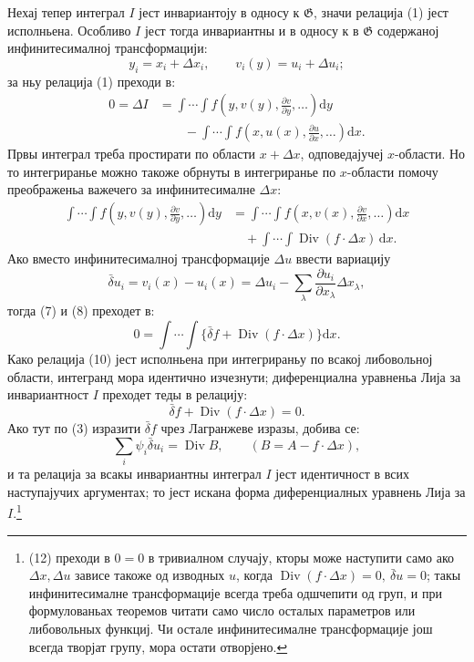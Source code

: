 ﻿\documentclass[11pt]{article}
\providecommand{\G}{\mathfrak G}
\providecommand{\D}{\Delta}
\providecommand{\p}{\partial}
\providecommand{\dd}{\mathrm d}
\DeclareMathOperator{\Div}{Div}
\providecommand{\bd}{\bar{\delta}}
\begin{document}
Нехај тепер интеграл \(I\) јест инвариантоју в односу к \(\G\), значи релација (1) јест исполньена. Особливо \(I\) јест тогда инвариантны и в односу к в \(\G\) содержаној инфинитесималној трансформацији:
\[
y_i=x_i+\D x_i,\qquad v_i(y)=u_i+\D u_i;
\]
за ньу релација (1) преходи в:
\begin{equation}
\begin{aligned}
0=\D I
&=\int\!\cdots\!\int f\!\left(y,v(y),\frac{\p v}{\p y},\ldots\right)\dd y\\
&\qquad-\int\!\cdots\!\int f\!\left(x,u(x),\frac{\p u}{\p x},\ldots\right)\dd x.
\end{aligned}
\tag{7}
\end{equation}
Првы интеграл треба простирати по области \(x+\D x\), одповедајучеј \(x\)-области. Но то интегриранье можно такоже обрнуты в интегриранье по \(x\)-области помочу преображеньа важечего за инфинитесималне \(\D x\):
\begin{equation}
\begin{aligned}
\int\!\cdots\!\int f\!\left(y,v(y),\frac{\p v}{\p y},\ldots\right)\dd y
&=\int\!\cdots\!\int f\!\left(x,v(x),\frac{\p v}{\p x},\ldots\right)\dd x\\
&\quad+\int\!\cdots\!\int \Div(f\cdot \D x)\,\dd x.
\end{aligned}
\tag{8}
\end{equation}
Ако вместо инфинитесималној трансформације \(\D u\) ввести вариацију
\begin{equation}
\bd u_i=v_i(x)-u_i(x)=\D u_i-\sum_\lambda\frac{\p u_i}{\p x_\lambda}\D x_\lambda,
\tag{9}
\end{equation}
тогда (7) и (8) преходет в:
\begin{equation}
0=\int\!\cdots\!\int\{\bd f+\Div(f\cdot\D x)\}\dd x.
\tag{10}
\end{equation}
Како релација (10) јест исполньена при интегрираньу по всакој либовольној области, интегранд мора идентично изчезнути; диференциална уравненьа Лија за инвариантност \(I\) преходет теды в релацију:
\begin{equation}
\bd f+\Div(f\cdot\D x)=0.
\tag{11}
\end{equation}
Ако тут по (3) изразити \(\bd f\) чрез Лагранжеве изразы, добива се:
\begin{equation}
\sum_i\psi_i\bd u_i=\Div B,\qquad (B=A-f\cdot\D x),
\tag{12}
\end{equation}
и та релација за всакы инвариантны интеграл \(I\) јест идентичност в всих наступајучих аргументах; то јест искана форма диференциалных уравнень Лија за \(I\).\footnote{(12) преходи в \(0=0\) в тривиалном случају, кторы може наступити само ако \(\D x,\D u\) зависе такоже од изводных \(u\), когда \(\Div(f\cdot\D x)=0,\ \bd u=0\); такы инфинитесималне трансформације всегда треба одшчепити од груп, и при формулованьах теоремов читати само число осталых параметров или либовольных функциј. Чи остале инфинитесималне трансформације још всегда творјат групу, мора остати отворјено.}
\end{document}
